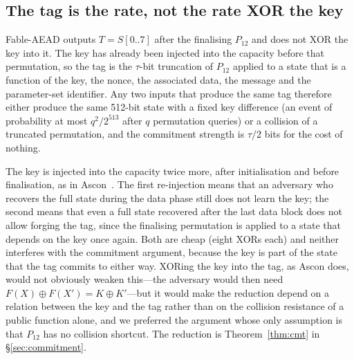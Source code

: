 \documentclass{iacrtrans}
\newcommand{\FableAEAD}{\textsf{Fable-AEAD}\xspace}
\newcommand{\PP}[1]{P_{#1}}
\begin{document}
\subsection{The tag is the rate, not the rate XOR the key}
\label{sec:whytag}
\FableAEAD outputs $T = S[0..7]$ after the finalising $\PP{12}$ and does not XOR the key into it. The key has already been injected into the capacity before that permutation, so the tag is the $\tau$-bit truncation of $\PP{12}$ applied to a state that is a function of the key, the nonce, the associated data, the message and the parameter-set identifier. Any two inputs that produce the same tag therefore either produce the same 512-bit state with a fixed key difference (an event of probability at most $q^2/2^{513}$ after $q$ permutation queries) or a collision of a truncated permutation, and the commitment strength is $\tau/2$ bits for the cost of nothing.

The key is injected into the capacity twice more, after initialisation and before finalisation, as in Ascon~\cite{Ascon21}. The first re-injection means that an adversary who recovers the full state during the data phase still does not learn the key; the second means that even a full state recovered after the last data block does not allow forging the tag, since the finalising permutation is applied to a state that depends on the key once again. Both are cheap (eight XORs each) and neither interferes with the commitment argument, because the key is part of the state that the tag commits to either way. XORing the key into the tag, as Ascon does, would not obviously weaken this---the adversary would then need $F(X) \oplus F(X') = K \oplus K'$---but it would make the reduction depend on a relation between the key and the tag rather than on the collision resistance of a public function alone, and we preferred the argument whose only assumption is that $\PP{12}$ has no collision shortcut. The reduction is Theorem~\ref{thm:cmt} in \S\ref{sec:commitment}.
\end{document}
